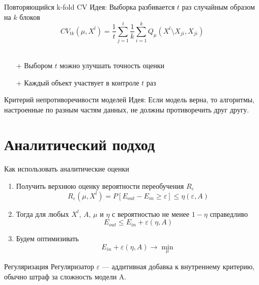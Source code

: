 \documentclass[10pt]{beamer}
\begin{document}
{
\begin{frame}{Повторяющийся k-fold CV}  
  \alert{Идея}: Выборка разбивается $t$ раз случайным образом на $k$ блоков\\
  
  $$CV_{tk}(\mu, X^l) = \frac{1}{t} \sum\limits_{j=1}^{t} \frac{1}{k} \sum\limits_{i=1}^{k} Q_{\mu}(X^l \setminus X_{ji}, X_{ji})$$\\
  \bigbreak
  \pause
  \begin{enumerate}
    \item[+] Выбором $t$ можно улучшать точность оценки
    \item[+] Каждый объект участвует в контроле $t$ раз
  \end{enumerate}
\end{frame}
}

\begin{frame}{Критерий непротиворечивости моделей}  
  \alert{Идея}: Если модель верна, то алгоритмы, настроенные по разным частям данных, не должны противоречить друг другу.\\
\end{frame}

\section{Аналитический подход}

\begin{frame}{Как использовать аналитические оценки}  
  \begin{enumerate}
    \item Получить верхнюю оценку вероятности переобучения $R_{\varepsilon}$\\
      $$R_{\varepsilon}(\mu, X^l) = P[E_{out} - E_{in} \geq \varepsilon] \leq \eta(\varepsilon, A)$$
    \item Тогда для любых $X^l$, $A$, $\mu$ и $\eta$ с вероятностью не менее $1-\eta$ справедливо\\
      $$E_{out} \leq E_{in} + \varepsilon(\eta, A)$$
    \item Будем оптимизивать \\
      $$E_{in} + \varepsilon(\eta, A) \rightarrow \min\limits_{\mu}$$
  \end{enumerate}
\end{frame}

\begin{frame}{Регуляризация}
  Регуляризатор $\varepsilon$ — аддитивная добавка к внутреннему критерию, обычно штраф за сложность модели A.
\end{frame}
\end{document}
